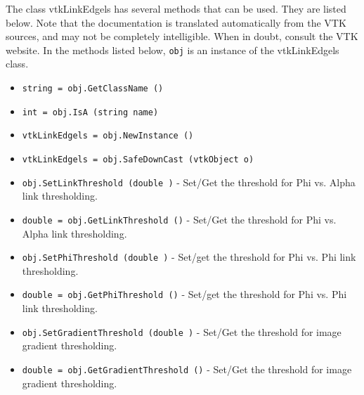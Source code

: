 The class vtkLinkEdgels has several methods that can be used.
  They are listed below.
Note that the documentation is translated automatically from the VTK sources,
and may not be completely intelligible.  When in doubt, consult the VTK website.
In the methods listed below, \verb|obj| is an instance of the vtkLinkEdgels class.
\begin{itemize}
\item  \verb|string = obj.GetClassName ()|

\item  \verb|int = obj.IsA (string name)|

\item  \verb|vtkLinkEdgels = obj.NewInstance ()|

\item  \verb|vtkLinkEdgels = obj.SafeDownCast (vtkObject o)|

\item  \verb|obj.SetLinkThreshold (double )| -  Set/Get the threshold for Phi vs. Alpha link thresholding.

\item  \verb|double = obj.GetLinkThreshold ()| -  Set/Get the threshold for Phi vs. Alpha link thresholding.

\item  \verb|obj.SetPhiThreshold (double )| -  Set/get the threshold for Phi vs. Phi link thresholding.

\item  \verb|double = obj.GetPhiThreshold ()| -  Set/get the threshold for Phi vs. Phi link thresholding.

\item  \verb|obj.SetGradientThreshold (double )| -  Set/Get the threshold for image gradient thresholding.

\item  \verb|double = obj.GetGradientThreshold ()| -  Set/Get the threshold for image gradient thresholding.

\end{itemize}
